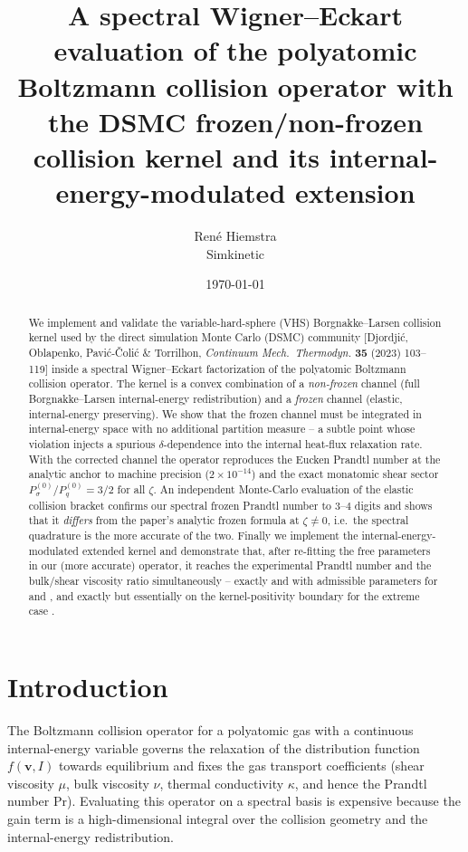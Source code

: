 \documentclass[11pt]{article}
\title{\bf A spectral Wigner--Eckart evaluation of the polyatomic\\
Boltzmann collision operator with the DSMC frozen/non-frozen\\
collision kernel and its internal-energy-modulated extension}
\author{Ren\'e Hiemstra\\
\small Simkinetic}
\date{\today}
\newcommand{\vv}{\mathbf{v}}
\renewcommand{\Pr}{\mathrm{Pr}}
\begin{document}
\maketitle

\begin{abstract}
We implement and validate the variable-hard-sphere (VHS) Borgnakke--Larsen collision
kernel used by the direct simulation Monte Carlo (DSMC) community
[Djordji\'c, Oblapenko, Pavi\'c-\v{C}oli\'c \& Torrilhon, \emph{Continuum Mech.\ Thermodyn.}
\textbf{35} (2023) 103--119] inside a spectral Wigner--Eckart factorization of the
polyatomic Boltzmann collision operator. The kernel is a convex combination of a
\emph{non-frozen} channel (full Borgnakke--Larsen internal-energy redistribution) and a
\emph{frozen} channel (elastic, internal-energy preserving). We show that the frozen channel
must be integrated in internal-energy space with no additional partition measure -- a subtle
point whose violation injects a spurious $\delta$-dependence into the internal heat-flux
relaxation rate. With the corrected channel the operator reproduces the Eucken Prandtl number
at the analytic anchor to machine precision ($2\times10^{-14}$) and the exact monatomic shear
sector $P_\sigma^{(0)}/P_q^{(0)}=3/2$ for all $\zeta$. An independent Monte-Carlo evaluation of
the elastic collision bracket confirms our spectral frozen Prandtl number to $3$--$4$ digits
and shows that it \emph{differs} from the paper's analytic frozen formula at $\zeta\neq0$,
i.e.\ the spectral quadrature is the more accurate of the two. Finally we implement the
internal-energy-modulated extended kernel and demonstrate that, after re-fitting the free
parameters in our (more accurate) operator, it reaches the experimental Prandtl number and the
bulk/shear viscosity ratio simultaneously -- exactly and with admissible parameters for
 and , and exactly but essentially on the kernel-positivity boundary for the
extreme case .
\end{abstract}

\tableofcontents
\medskip

\section{Introduction}
\label{sec:intro}

The Boltzmann collision operator for a polyatomic gas with a continuous internal-energy
variable governs the relaxation of the distribution function $f(\vv,I)$ towards equilibrium and
fixes the gas transport coefficients (shear viscosity $\mu$, bulk viscosity $\nu$, thermal
conductivity $\kappa$, and hence the Prandtl number $\Pr$). Evaluating this operator on a
spectral basis is expensive because the gain term is a high-dimensional integral over the
collision geometry and the internal-energy redistribution.
\end{document}
